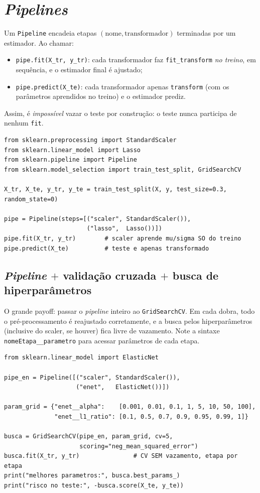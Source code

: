 \documentclass[11pt,a4paper]{article}
\begin{document}
\section{\emph{Pipelines}}
Um \texttt{Pipeline} encadeia etapas $(\text{nome}, \text{transformador})$
terminadas por um estimador. Ao chamar:
\begin{itemize}[leftmargin=1.4cm,nosep]
  \item \texttt{pipe.fit(X\_tr, y\_tr)}: cada transformador faz \texttt{fit\_transform}
        \emph{no treino}, em sequência, e o estimador final é ajustado;
  \item \texttt{pipe.predict(X\_te)}: cada transformador apenas \texttt{transform}
        (com os parâmetros aprendidos no treino) e o estimador prediz.
\end{itemize}
Assim, é \emph{impossível} vazar o teste por construção: o teste nunca participa de
nenhum \texttt{fit}.

\begin{lstlisting}
from sklearn.preprocessing import StandardScaler
from sklearn.linear_model import Lasso
from sklearn.pipeline import Pipeline
from sklearn.model_selection import train_test_split, GridSearchCV

X_tr, X_te, y_tr, y_te = train_test_split(X, y, test_size=0.3, random_state=0)

pipe = Pipeline(steps=[("scaler", StandardScaler()),
                       ("lasso",  Lasso())])
pipe.fit(X_tr, y_tr)        # scaler aprende mu/sigma SO do treino
pipe.predict(X_te)          # teste e apenas transformado
\end{lstlisting}

\subsection{\emph{Pipeline} $+$ validação cruzada $+$ busca de hiperparâmetros}
O grande payoff: passar o \emph{pipeline} inteiro ao \texttt{GridSearchCV}. Em cada
dobra, todo o pré-processamento é reajustado corretamente, e a busca pelos
hiperparâmetros (inclusive do scaler, se houver) fica livre de vazamento. Note a
sintaxe \texttt{nomeEtapa\_\_parametro} para acessar parâmetros de cada etapa.

\begin{lstlisting}
from sklearn.linear_model import ElasticNet

pipe_en = Pipeline([("scaler", StandardScaler()),
                    ("enet",   ElasticNet())])

param_grid = {"enet__alpha":    [0.001, 0.01, 0.1, 1, 5, 10, 50, 100],
              "enet__l1_ratio": [0.1, 0.5, 0.7, 0.9, 0.95, 0.99, 1]}

busca = GridSearchCV(pipe_en, param_grid, cv=5,
                     scoring="neg_mean_squared_error")
busca.fit(X_tr, y_tr)               # CV SEM vazamento, etapa por etapa
print("melhores parametros:", busca.best_params_)
print("risco no teste:", -busca.score(X_te, y_te))
\end{lstlisting}
\end{document}
